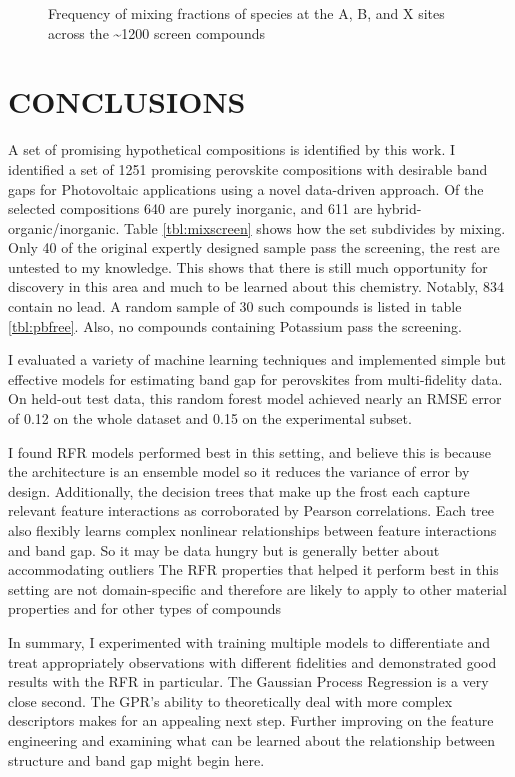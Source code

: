  
\begin{figure}[htbp]
\centering

\caption{\label{fig:freq} Frequency of mixing fractions of species at the A, B, and X sites across the \textasciitilde{}1200 screen compounds}
\end{figure}

\chapter{CONCLUSIONS}
\label{sec:org60937c6}
A set of promising hypothetical compositions is identified by this work.
I identified a set of 1251 promising perovskite compositions with desirable band gaps for Photovoltaic applications using a novel data-driven approach.
Of the selected compositions 640 are purely inorganic, and 611 are hybrid-organic/inorganic.
Table \ref{tbl:mixscreen} shows how the set subdivides by mixing.
Only 40 of the original expertly designed sample pass the screening, the rest are untested to my knowledge.
This shows that there is still much opportunity for discovery in this area and much to be learned about this chemistry.
Notably, 834 contain no lead. A random sample of 30 such compounds is listed in table \ref{tbl:pbfree}.
Also, no compounds containing Potassium pass the screening.

I evaluated a variety of machine learning techniques and implemented simple but effective models for estimating band gap for perovskites from multi-fidelity data.
On held-out test data, this random forest model achieved nearly an RMSE error of 0.12 on the whole dataset and 0.15 on the experimental subset.

I found RFR models performed best in this setting, and believe this is because the architecture is an ensemble model so it reduces the variance of error by design.
Additionally, the decision trees that make up the frost each capture relevant feature interactions as corroborated by Pearson correlations.
Each tree also flexibly learns complex nonlinear relationships between feature interactions and band gap.
So it may be data hungry but is generally better about accommodating outliers
The RFR properties that helped it perform best in this setting are not domain-specific and therefore are likely to apply to other material properties and for other types of compounds

In summary, I experimented with training multiple models to differentiate and treat appropriately observations with different fidelities and demonstrated good results with the RFR in particular.
The Gaussian Process Regression is a very close second.
The GPR's ability to theoretically deal with more complex descriptors makes for an appealing next step.
Further improving on the feature engineering and examining what can be learned about the relationship between structure and band gap might begin here.

